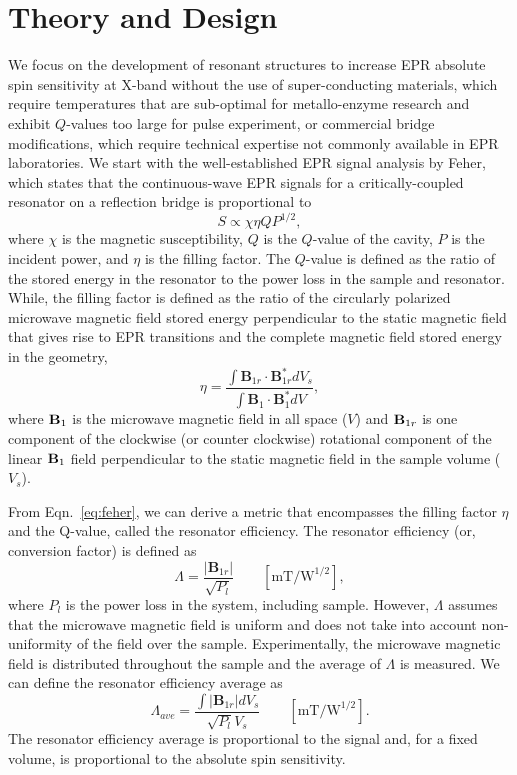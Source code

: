\section{Theory and Design}
We focus on the development of resonant structures to increase EPR absolute spin sensitivity at X-band without the use of super-conducting materials, which require temperatures that are sub-optimal for metallo-enzyme research and exhibit $Q$-values too large for pulse experiment, or commercial bridge modifications, which require technical expertise not commonly available in EPR laboratories. We start with the well-established EPR signal analysis by Feher,\cite{FeherSignal} which states that the continuous-wave EPR signals for a critically-coupled resonator on a reflection bridge is proportional to
\begin{equation}
 S \propto \chi \eta Q P^{1/2},\label{eq:feher}
\end{equation}
where $\chi$ is the magnetic susceptibility, $Q$ is the $Q$-value of the cavity, $P$ is the incident power, and $\eta$ is the filling factor. The $Q$-value is defined as the ratio of the stored energy in the resonator to the power loss in the sample and resonator. \cite{ginzton1957microwave} While, the filling factor is defined as the ratio of the circularly polarized microwave magnetic field stored energy perpendicular to the static magnetic field that gives rise to EPR transitions and the complete magnetic field stored energy in the geometry,
\begin{equation}
 \eta = \frac{\int {\mathbf B}_{1r} \cdot {\mathbf B}_{1r}^* dV_s}{\int {\mathbf B}_1 \cdot {\mathbf B}_1^* dV},
\end{equation}
where ${\textbf B}_1$ is the microwave magnetic field in all space ($V$) and ${\textbf B}_{1r}$ is one component of the clockwise (or counter clockwise) rotational component of the linear ${\textbf B}_1$ field perpendicular to the static magnetic field in the sample volume ($V_s$). \cite{FeherSignal, misrabook}

From Eqn.~\ref{eq:feher}, we can derive a metric that encompasses the filling factor $\eta$ and the Q-value, called the resonator efficiency. \cite{hydehoff} The resonator efficiency (or, conversion factor) is defined as 
\begin{equation}
 \Lambda = \frac{\left|{\mathbf B}_{1r}\right|}{\sqrt{P_l}} \qquad [\text{mT/W}^{1/2}],
\end{equation}
where $P_l$ is the power loss in the system, including sample. However, $\Lambda$ assumes that the microwave magnetic field is uniform and does not take into account non-uniformity of the field over the sample. Experimentally, the microwave magnetic field is distributed throughout the sample and the average of $\Lambda$ is measured. We can define the resonator efficiency average as
\begin{equation}
 \Lambda_{ave} = \frac{\int |{\mathbf B}_{1r}| dV_s}{\sqrt{P_l} V_s} \qquad [\text{mT/W}^{1/2}].
\end{equation}
The resonator efficiency average is proportional to the signal and, for a fixed volume, is proportional to the absolute spin sensitivity. 

